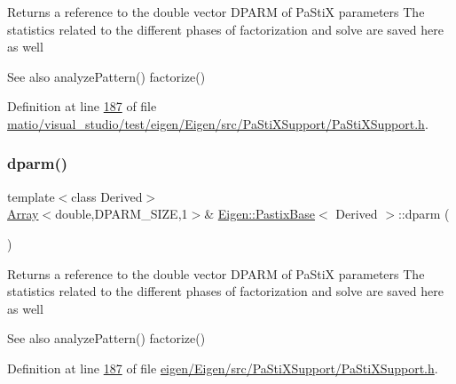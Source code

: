 Returns a reference to the double vector D\+P\+A\+RM of Pa\+StiX parameters The statistics related to the different phases of factorization and solve are saved here as well \begin{DoxySeeAlso}{See also}
analyze\+Pattern() factorize() 
\end{DoxySeeAlso}


Definition at line \hyperlink{matio_2visual__studio_2test_2eigen_2_eigen_2src_2_pa_sti_x_support_2_pa_sti_x_support_8h_source_l00187}{187} of file \hyperlink{matio_2visual__studio_2test_2eigen_2_eigen_2src_2_pa_sti_x_support_2_pa_sti_x_support_8h_source}{matio/visual\+\_\+studio/test/eigen/\+Eigen/src/\+Pa\+Sti\+X\+Support/\+Pa\+Sti\+X\+Support.\+h}.

\mbox{\label{class_eigen_1_1_pastix_base_af4a29373aa3e6a980738efde33f92a76}} 
\subsubsection{\texorpdfstring{dparm()}{dparm()}\hspace{0.1cm}{\footnotesize\ttfamily [2/4]}}
{\footnotesize\ttfamily template$<$class Derived$>$ \\
\hyperlink{group___core___module_class_eigen_1_1_array}{Array}$<$double,D\+P\+A\+R\+M\+\_\+\+S\+I\+ZE,1$>$\& \hyperlink{class_eigen_1_1_pastix_base}{Eigen\+::\+Pastix\+Base}$<$ Derived $>$\+::dparm (\begin{DoxyParamCaption}{ }\end{DoxyParamCaption})\hspace{0.3cm}{\ttfamily [inline]}}

Returns a reference to the double vector D\+P\+A\+RM of Pa\+StiX parameters The statistics related to the different phases of factorization and solve are saved here as well \begin{DoxySeeAlso}{See also}
analyze\+Pattern() factorize() 
\end{DoxySeeAlso}


Definition at line \hyperlink{eigen_2_eigen_2src_2_pa_sti_x_support_2_pa_sti_x_support_8h_source_l00187}{187} of file \hyperlink{eigen_2_eigen_2src_2_pa_sti_x_support_2_pa_sti_x_support_8h_source}{eigen/\+Eigen/src/\+Pa\+Sti\+X\+Support/\+Pa\+Sti\+X\+Support.\+h}.

\mbox{\label{class_eigen_1_1_pastix_base_a6e7baecd4990d6df9b5713cb6499e940}} 
